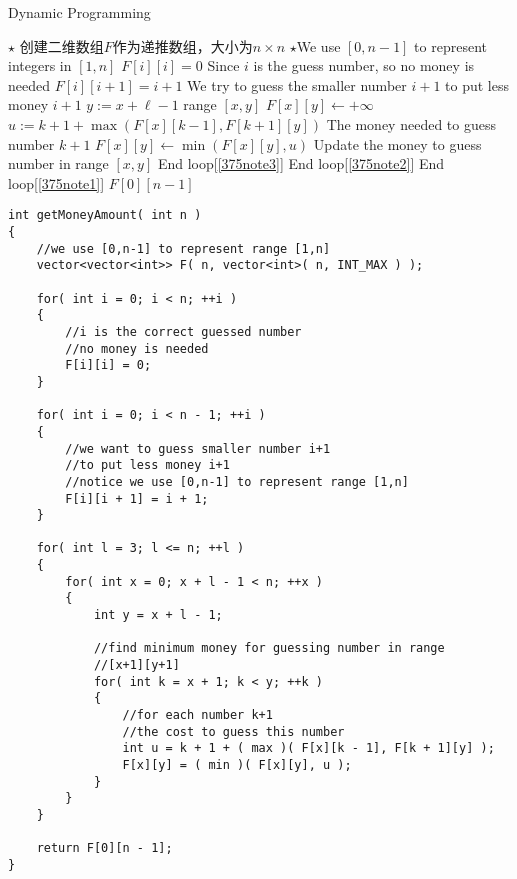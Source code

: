 \setcounter{algorithm}{0}
\begin{algorithm}[H]
\caption{Dynamic Programming}
\begin{algorithmic}[1]
\State $\star$ 创建二维数组$F$作为递推数组，大小为$n\times n$
\State $ \star $We use $[0,n-1]$ to represent integers in $[1,n]$
\State $F[i][i]=0$ \Comment Since $i$ is the guess number, so no money is needed
\EndFor
{}
\State $F[i][i+1]=i+1$ \Comment We try to guess the smaller number $i+1$ to put less money $i+1$
\EndFor
{}  \label{375note1}
 \label{375note2}
\State $y:=x+\ell-1$ \Comment range $[x,y]$
\State $F[x][y] \gets +\infty$
 \label{375note3}
\State $u := k+1+\max(F[x][k-1], F[k+1][y])$ \Comment The money needed to guess number $k+1$
\State $F[x][y]\gets \min(F[x][y], u)$ \Comment Update the money to guess number in range $[x,y]$
\EndFor \Comment End loop[\ref{375note3}]
\EndFor \Comment End loop[\ref{375note2}]
\EndFor \Comment End loop[\ref{375note1}]
\State \Return $F[0][n-1]$
\EndProcedure
\end{algorithmic}
\end{algorithm}

\setcounter{lstlisting}{0}
\begin{lstlisting}[style=customc, caption={Dynamic Programming}]
int getMoneyAmount( int n )
{
    //we use [0,n-1] to represent range [1,n]
    vector<vector<int>> F( n, vector<int>( n, INT_MAX ) );

    for( int i = 0; i < n; ++i )
    {
        //i is the correct guessed number
        //no money is needed
        F[i][i] = 0;
    }

    for( int i = 0; i < n - 1; ++i )
    {
        //we want to guess smaller number i+1
        //to put less money i+1
        //notice we use [0,n-1] to represent range [1,n]
        F[i][i + 1] = i + 1;
    }

    for( int l = 3; l <= n; ++l )
    {
        for( int x = 0; x + l - 1 < n; ++x )
        {
            int y = x + l - 1;

            //find minimum money for guessing number in range
            //[x+1][y+1]
            for( int k = x + 1; k < y; ++k )
            {
                //for each number k+1
                //the cost to guess this number
                int u = k + 1 + ( max )( F[x][k - 1], F[k + 1][y] );
                F[x][y] = ( min )( F[x][y], u );
            }
        }
    }

    return F[0][n - 1];
}
\end{lstlisting}